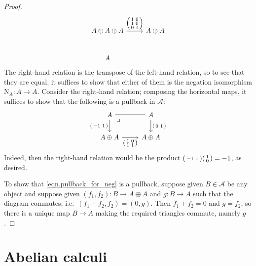 \documentclass[11pt, oneside, article]{memoir}
\theoremstyle{plain}
\theoremstyle{definition}
\theoremstyle{remark}
\newcommand{\cat}[1]{\mathcal{#1}}%
\newcommand{\funn}[1]{\mathrm{#1}}%
\newcommand{\Neg}[1]{\funn{N}_{#1}}
\newcommand{\pb}[1][very near start]{\ar[dr, phantom, #1, "\lrcorner"]}
\begin{document}
\begin{proof}
\[\begin{tikzcd}[row sep=25pt, ampersand replacement=\&]
	A\oplus A\oplus A
		\ar[r, "{\begin{psmallmatrix}1&0\\1&0\\0&1\end{psmallmatrix}}"]\&
	A\oplus A\\
	A
\end{tikzcd}
\]
The right-hand relation is the transpose of the left-hand relation, so to see that they are equal, it suffices to show that either of them is the negation isomorphism $\Neg{A}\colon A\to A$. Consider the right-hand relation; composing the horizontal maps, it suffices to show that the following is a pullback in $\cat{A}$:
\begin{equation}\label{eqn.pullback_for_neg}
\begin{tikzcd}[ampersand replacement=\&]
	A\ar[r, equal]
		\ar[d, "{\begin{psmallmatrix}-1&1\end{psmallmatrix}}"']\pb\&
	A
		\ar[d, "{\begin{psmallmatrix}0&1\end{psmallmatrix}}"]\\
	A\oplus A
		\ar[r, "{\begin{psmallmatrix}1&0\\1&1\end{psmallmatrix}}"']\&
	A\oplus A
\end{tikzcd}
\end{equation}
Indeed, then the right-hand relation would be the product $\begin{psmallmatrix}-1&1\end{psmallmatrix}\begin{psmallmatrix}1\\0\end{psmallmatrix}=-1$, as desired.

To show that \cref{eqn.pullback_for_neg} is a pullback, suppose given $B\in\cat{A}$ be any object and suppose given $(f_1,f_2)\colon B\to A\oplus A$ and $g\colon B\to A$ such that the diagram commutes, i.e.\ $(f_1+f_2,f_2)=(0, g)$. Then $f_1+f_2=0$ and $g=f_2$, so there is a unique map $B\to A$ making the required triangles commute, namely $g$. 
\end{proof}


\chapter{Abelian calculi}
\end{document}

